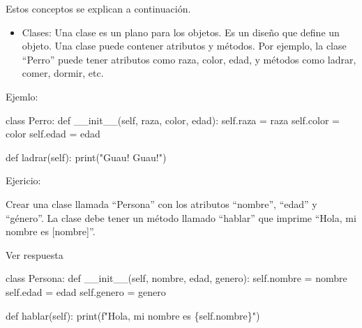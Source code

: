 \documentclass[
  a4paper,
  DIV=11,
  numbers=noendperiod,
  onepage,
  openany]{scrreprt}
\newenvironment{Shaded}{\begin{snugshade}}{\end{snugshade}}
\newcommand{\BuiltInTok}[1]{\textcolor[rgb]{0.00,0.23,0.31}{#1}}
\newcommand{\FunctionTok}[1]{\textcolor[rgb]{0.28,0.35,0.67}{#1}}
\newcommand{\KeywordTok}[1]{\textcolor[rgb]{0.00,0.23,0.31}{#1}}
\newcommand{\NormalTok}[1]{\textcolor[rgb]{0.00,0.23,0.31}{#1}}
\newcommand{\OperatorTok}[1]{\textcolor[rgb]{0.37,0.37,0.37}{#1}}
\newcommand{\SpecialCharTok}[1]{\textcolor[rgb]{0.37,0.37,0.37}{#1}}
\newcommand{\SpecialStringTok}[1]{\textcolor[rgb]{0.13,0.47,0.30}{#1}}
\newcommand{\StringTok}[1]{\textcolor[rgb]{0.13,0.47,0.30}{#1}}
\newcommand{\VariableTok}[1]{\textcolor[rgb]{0.07,0.07,0.07}{#1}}
\providecommand{\tightlist}{%
  \setlength{\itemsep}{0pt}\setlength{\parskip}{0pt}}\usepackage{longtable,booktabs,array}
\begin{document}
Estos conceptos se explican a continuación.

\begin{itemize}
\tightlist
\item
  Clases: Una clase es un plano para los objetos. Es un diseño que
  define un objeto. Una clase puede contener atributos y métodos. Por
  ejemplo, la clase ``Perro'' puede tener atributos como raza, color,
  edad, y métodos como ladrar, comer, dormir, etc.
\end{itemize}

Ejemlo:

\begin{Shaded}
\begin{Highlighting}[]
\KeywordTok{class}\NormalTok{ Perro:}
    \KeywordTok{def} \FunctionTok{\_\_init\_\_}\NormalTok{(}\VariableTok{self}\NormalTok{, raza, color, edad):}
        \VariableTok{self}\NormalTok{.raza }\OperatorTok{=}\NormalTok{ raza}
        \VariableTok{self}\NormalTok{.color }\OperatorTok{=}\NormalTok{ color}
        \VariableTok{self}\NormalTok{.edad }\OperatorTok{=}\NormalTok{ edad}

    \KeywordTok{def}\NormalTok{ ladrar(}\VariableTok{self}\NormalTok{):}
        \BuiltInTok{print}\NormalTok{(}\StringTok{"Guau! Guau!"}\NormalTok{)}
\end{Highlighting}
\end{Shaded}

Ejericio:

Crear una clase llamada ``Persona'' con los atributos ``nombre'',
``edad'' y ``género''. La clase debe tener un método llamado ``hablar''
que imprime ``Hola, mi nombre es {[}nombre{]}''.

Ver respuesta

\begin{Shaded}
\begin{Highlighting}[]
\KeywordTok{class}\NormalTok{ Persona:}
    \KeywordTok{def} \FunctionTok{\_\_init\_\_}\NormalTok{(}\VariableTok{self}\NormalTok{, nombre, edad, genero):}
        \VariableTok{self}\NormalTok{.nombre }\OperatorTok{=}\NormalTok{ nombre}
        \VariableTok{self}\NormalTok{.edad }\OperatorTok{=}\NormalTok{ edad}
        \VariableTok{self}\NormalTok{.genero }\OperatorTok{=}\NormalTok{ genero}

    \KeywordTok{def}\NormalTok{ hablar(}\VariableTok{self}\NormalTok{):}
        \BuiltInTok{print}\NormalTok{(}\SpecialStringTok{f"Hola, mi nombre es }\SpecialCharTok{\{}\VariableTok{self}\SpecialCharTok{.}\NormalTok{nombre}\SpecialCharTok{\}}\SpecialStringTok{"}\NormalTok{)}
\end{Highlighting}
\end{Shaded}
\end{document}
